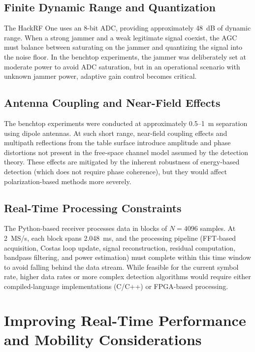 \documentclass{article}
\begin{document}
\subsection{Finite Dynamic Range and Quantization}

The HackRF One uses an 8-bit ADC, providing approximately 48~dB of dynamic range. When a strong jammer and a weak legitimate signal coexist, the AGC must balance between saturating on the jammer and quantizing the signal into the noise floor. In the benchtop experiments, the jammer was deliberately set at moderate power to avoid ADC saturation, but in an operational scenario with unknown jammer power, adaptive gain control becomes critical.

\subsection{Antenna Coupling and Near-Field Effects}

The benchtop experiments were conducted at approximately 0.5--1~m separation using dipole antennas. At such short range, near-field coupling effects and multipath reflections from the table surface introduce amplitude and phase distortions not present in the free-space channel model assumed by the detection theory. These effects are mitigated by the inherent robustness of energy-based detection (which does not require phase coherence), but they would affect polarization-based methods more severely.

\subsection{Real-Time Processing Constraints}

The Python-based receiver processes data in blocks of $N = 4096$ samples. At 2~MS/s, each block spans 2.048~ms, and the processing pipeline (FFT-based acquisition, Costas loop update, signal reconstruction, residual computation, bandpass filtering, and power estimation) must complete within this time window to avoid falling behind the data stream. While feasible for the current symbol rate, higher data rates or more complex detection algorithms would require either compiled-language implementations (C/C++) or FPGA-based processing.


\newpage
\section{Improving Real-Time Performance and Mobility Considerations}
\end{document}

